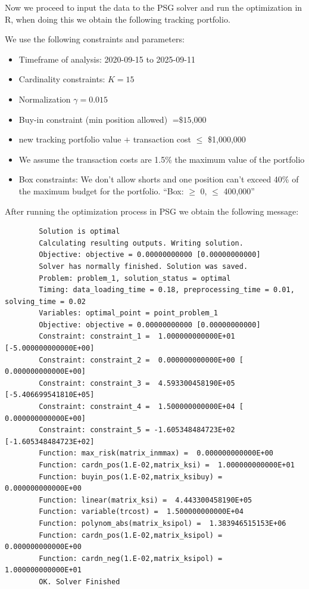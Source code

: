 \documentclass[12pt, a4paper]{article}
\begin{document}
	Now we proceed to input the data to the PSG solver and run the optimization in R, when doing this we obtain the following tracking portfolio. 
	
	We use the following constraints and parameters:
	
	\begin{itemize}
		\item Timeframe of analysis: 2020-09-15 to 2025-09-11
		\item Cardinality constraints: $K=15$
		\item Normalization $\gamma = 0.015$
		\item Buy-in constraint (min position allowed) $=\text{\$15,000}$
		\item new tracking portfolio value $+$ transaction cost $\leq$ \$1,000,000 
		\item We assume the transaction costs are 1.5\% the maximum value of the portfolio
		\item Box constraints: We don't allow shorts and one position can't exceed 40\% of the maximum budget for the portfolio. ``Box: $\geq$ 0, $\leq$ 400,000''
	\end{itemize}
	
	After running the optimization process in PSG we obtain the following message:
	
	\begin{verbatim}
		Solution is optimal
		Calculating resulting outputs. Writing solution.
		Objective: objective = 0.00000000000 [0.00000000000]
		Solver has normally finished. Solution was saved.
		Problem: problem_1, solution_status = optimal
		Timing: data_loading_time = 0.18, preprocessing_time = 0.01, solving_time = 0.02
		Variables: optimal_point = point_problem_1
		Objective: objective = 0.00000000000 [0.00000000000]
		Constraint: constraint_1 =  1.000000000000E+01 [-5.000000000000E+00]
		Constraint: constraint_2 =  0.000000000000E+00 [ 0.000000000000E+00]
		Constraint: constraint_3 =  4.593300458190E+05 [-5.406699541810E+05]
		Constraint: constraint_4 =  1.500000000000E+04 [ 0.000000000000E+00]
		Constraint: constraint_5 = -1.605348484723E+02 [-1.605348484723E+02]
		Function: max_risk(matrix_inmmax) =  0.000000000000E+00
		Function: cardn_pos(1.E-02,matrix_ksi) =  1.000000000000E+01
		Function: buyin_pos(1.E-02,matrix_ksibuy) =  0.000000000000E+00
		Function: linear(matrix_ksi) =  4.443300458190E+05
		Function: variable(trcost) =  1.500000000000E+04
		Function: polynom_abs(matrix_ksipol) =  1.383946515153E+06
		Function: cardn_pos(1.E-02,matrix_ksipol) =  0.000000000000E+00
		Function: cardn_neg(1.E-02,matrix_ksipol) =  1.000000000000E+01
		OK. Solver Finished
	\end{verbatim}
	
\end{document}
